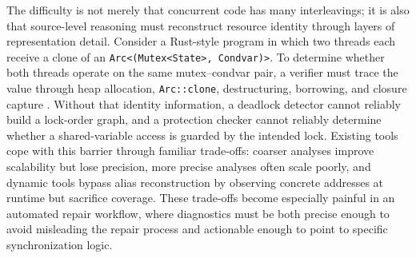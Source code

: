 The difficulty is not merely that concurrent code has many interleavings; it is also that source-level reasoning must reconstruct resource identity through layers of representation detail. Consider a Rust-style program in which two threads each receive a clone of an \texttt{Arc<(Mutex<State>, Condvar)>}. To determine whether both threads operate on the same mutex--condvar pair, a verifier must trace the value through heap allocation, \texttt{Arc::clone}, destructuring, borrowing, and closure capture \cite{Boyapati2002Ownership,Pratikakis2006Locksmith,Naik2006StaticRaceJava}. Without that identity information, a deadlock detector cannot reliably build a lock-order graph, and a protection checker cannot reliably determine whether a shared-variable access is guarded by the intended lock. Existing tools cope with this barrier through familiar trade-offs: coarser analyses improve scalability but lose precision, more precise analyses often scale poorly, and dynamic tools bypass alias reconstruction by observing concrete addresses at runtime but sacrifice coverage. These trade-offs become especially painful in an automated repair workflow, where diagnostics must be both precise enough to avoid misleading the repair process and actionable enough to point to specific synchronization logic.

